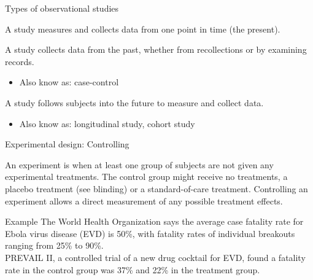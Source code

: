 \documentclass[xcolor=table, aspectratio=169, bigger]{beamer}
\begin{document}
\begin{frame}{Types of observational studies}

\begin{block}{}
A  study measures and collects data from one point in time (the present).
\end{block}
\pause
\begin{block}{}
A  study collects data from the past, whether from recollections or by examining records.
\begin{itemize}
\item Also know as: case-control
\end{itemize}
\end{block}
\pause
\begin{block}{}
A  study follows subjects into the future to measure and collect data.
\begin{itemize}
\item Also know as: longitudinal study, cohort study
\end{itemize}
\end{block}
\end{frame}

\begin{frame}{Experimental design: Controlling}
\begin{block}{}
An experiment is  when at least one group of subjects are not given any experimental treatments. The control group might receive no treatments, a placebo treatment (see blinding) or a standard-of-care treatment. Controlling an experiment allows a direct measurement of any possible treatment effects. 
\end{block}

\begin{exampleblock}{Example}
The World Health Organization says the average case fatality rate for Ebola virus disease (EVD) is 50\%, with fatality rates of individual breakouts ranging from 25\% to 90\%. \\
\medskip
PREVAIL II, a controlled trial of a new drug cocktail for EVD, found a fatality rate in the control group was 37\% and 22\% in the treatment group.
\end{exampleblock}

\end{frame}
\end{document}
